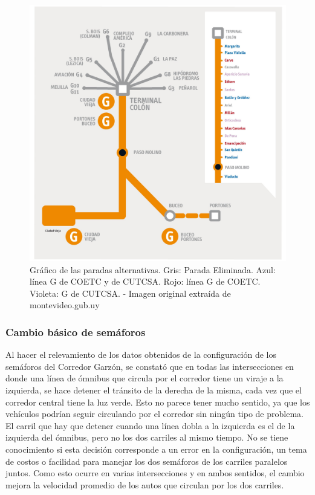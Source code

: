 

\begin{figure}[ht]
	\centering
	\includegraphics[width=0.9\linewidth]{Figures/paradas_alternativas}
	\caption[Gráfico de las paradas alternativas.]{Gráfico de las paradas alternativas. Gris: Parada Eliminada. Azul: línea G de COETC y de CUTCSA. Rojo: línea G de COETC. Violeta: G de CUTCSA. - Imagen original extraída de montevideo.gub.uy}
	\label{fig:paradas_alternadas}
\end{figure}



\subsubsection{Cambio básico de semáforos}
Al hacer el relevamiento de los datos obtenidos de la configuración de los semáforos del Corredor Garzón, se constató que en todas las intersecciones en donde una línea de ómnibus que circula por el corredor tiene un viraje a la izquierda, se hace detener el tránsito de la derecha de la misma, cada vez que el corredor central tiene la luz verde. Esto no parece tener mucho sentido, ya que los vehículos podrían seguir circulando por el corredor sin ningún tipo de problema. El carril que hay que detener cuando una línea dobla a la izquierda es el de la izquierda del ómnibus, pero no los dos carriles al mismo tiempo. No se tiene conocimiento si esta decisión corresponde a un error en la configuración, un tema de costos o facilidad para manejar los dos semáforos de los carriles paralelos juntos. Como esto ocurre en varias intersecciones y en ambos sentidos, el cambio mejora la velocidad promedio de los autos que circulan por los dos carriles.

